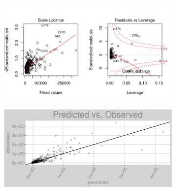\begin{figure}[h]
\centering
\begin{subfigure}{1\textwidth}
\centering
\includegraphics[width=.99\textwidth, height=0.475\textheight]{Images/district_heat_pls_res_2.png}
\end{subfigure}
\begin{subfigure}{1\textwidth}
\centering
\includegraphics[width=.99\textwidth, height=0.3\textheight]{Images/district_heat_pls_pvo.png}
\end{subfigure}
\end{figure}
\FloatBarrier
\newpage
